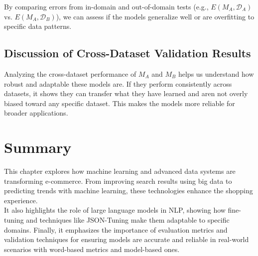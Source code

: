 By comparing errors from in-domain and out-of-domain tests (e.g., $E(M_A, \mathcal{D}_A)$ vs. $E(M_A, \mathcal{D}_B)$), we can assess if the models generalize well or are overfitting to specific data patterns.

\subsection{Discussion of Cross-Dataset Validation Results}

Analyzing the cross-dataset performance of $M_A$ and $M_B$ helps us understand how robust and adaptable these models are. If they perform consistently across datasets, it shows they can transfer what they have learned and aren not overly biased toward any specific dataset. This makes the models more reliable for broader applications.

\section{Summary}

This chapter explores how machine learning and advanced data systems are transforming e-commerce. From improving search results using big data to predicting trends with machine learning, these technologies enhance the shopping experience.
\\

It also highlights the role of large language models in NLP, showing how fine-tuning and techniques like JSON-Tuning make them adaptable to specific domains. Finally, it emphasizes the importance of evaluation metrics and validation techniques for ensuring models are accurate and reliable in real-world scenarios with word-based metrics and model-based ones.
